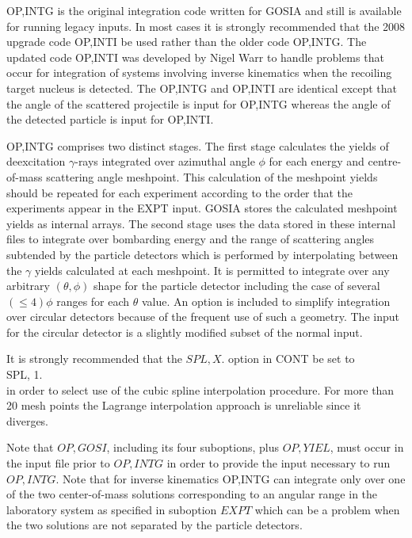 \documentclass[10pt]{article}
\begin{document}
OP,INTG is the original integration code written for GOSIA and still is available for running legacy inputs. In most cases it is strongly recommended that the 2008 upgrade code OP,INTI be used rather than the older code OP,INTG. The updated code OP,INTI was developed by Nigel Warr to handle problems that occur for integration of systems involving inverse kinematics when the recoiling target nucleus is detected. The OP,INTG and OP,INTI are identical except that the angle of the scattered projectile is input for OP,INTG whereas the angle of the detected particle is input for OP,INTI.

OP,INTG comprises two distinct stages. The first stage calculates the yields of deexcitation $\gamma$-rays integrated over azimuthal angle $\phi$ for each energy and centre-of-mass scattering angle meshpoint. This calculation of the meshpoint yields should be repeated for each experiment according to the order that the experiments appear in the EXPT input. GOSIA stores the calculated meshpoint yields as internal arrays. The second stage uses the data stored in these internal files to integrate over bombarding energy and the range of scattering angles subtended by the particle detectors which is performed by interpolating between the $\gamma$ yields calculated at each meshpoint. It is permitted to integrate over any arbitrary $(\theta, \phi)$ shape for the particle detector including the case of several $(\leq 4) \phi$ ranges for each $\theta$ value. An option is included to simplify integration over circular detectors because of the frequent use of such a geometry. The input for the circular detector is a slightly modified subset of the normal input.

It is strongly recommended that the $S P L, X$. option in CONT be set to\\
SPL, 1.\\
in order to select use of the cubic spline interpolation procedure. For more than 20 mesh points the Lagrange interpolation approach is unreliable since it diverges.

Note that $O P, G O S I$, including its four suboptions, plus $O P, Y I E L$, must occur in the input file prior to $O P, I N T G$ in order to provide the input necessary to run $O P, I N T G$. Note that for inverse kinematics OP,INTG can integrate only over one of the two center-of-mass solutions corresponding to an angular range in the laboratory system as specified in suboption $E X P T$ which can be a problem when the two solutions are not separated by the particle detectors.
\end{document}
